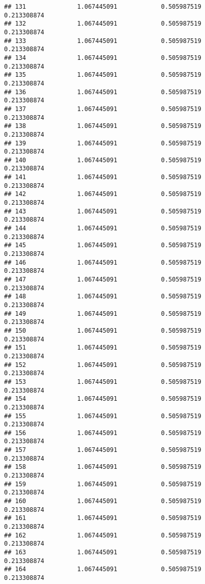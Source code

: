 \documentclass[]{article}
\begin{document}
\begin{verbatim}
## 131              1.067445091            0.505987519            0.213308874
## 132              1.067445091            0.505987519            0.213308874
## 133              1.067445091            0.505987519            0.213308874
## 134              1.067445091            0.505987519            0.213308874
## 135              1.067445091            0.505987519            0.213308874
## 136              1.067445091            0.505987519            0.213308874
## 137              1.067445091            0.505987519            0.213308874
## 138              1.067445091            0.505987519            0.213308874
## 139              1.067445091            0.505987519            0.213308874
## 140              1.067445091            0.505987519            0.213308874
## 141              1.067445091            0.505987519            0.213308874
## 142              1.067445091            0.505987519            0.213308874
## 143              1.067445091            0.505987519            0.213308874
## 144              1.067445091            0.505987519            0.213308874
## 145              1.067445091            0.505987519            0.213308874
## 146              1.067445091            0.505987519            0.213308874
## 147              1.067445091            0.505987519            0.213308874
## 148              1.067445091            0.505987519            0.213308874
## 149              1.067445091            0.505987519            0.213308874
## 150              1.067445091            0.505987519            0.213308874
## 151              1.067445091            0.505987519            0.213308874
## 152              1.067445091            0.505987519            0.213308874
## 153              1.067445091            0.505987519            0.213308874
## 154              1.067445091            0.505987519            0.213308874
## 155              1.067445091            0.505987519            0.213308874
## 156              1.067445091            0.505987519            0.213308874
## 157              1.067445091            0.505987519            0.213308874
## 158              1.067445091            0.505987519            0.213308874
## 159              1.067445091            0.505987519            0.213308874
## 160              1.067445091            0.505987519            0.213308874
## 161              1.067445091            0.505987519            0.213308874
## 162              1.067445091            0.505987519            0.213308874
## 163              1.067445091            0.505987519            0.213308874
## 164              1.067445091            0.505987519            0.213308874

\end{verbatim}
\end{document}
